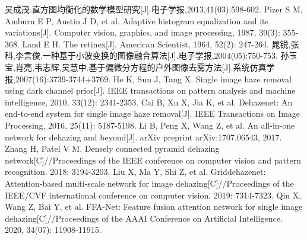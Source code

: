 \documentclass[12pt]{article}
\begin{document}
\begin{thebibliography}{99}  


吴成茂.直方图均衡化的数学模型研究[J].电子学报,2013,41(03):598-602.
Pizer S M, Amburn E P, Austin J D, et al. Adaptive histogram equalization and its variations[J]. Computer vision, graphics, and image processing, 1987, 39(3): 355-368.
Land E H. The retinex[J]. American Scientist, 1964, 52(2): 247-264.
晁锐,张科,李言俊.一种基于小波变换的图像融合算法[J].电子学报,2004(05):750-753.
孙玉宝,肖亮,韦志辉,吴慧中.基于偏微分方程的户外图像去雾方法[J].系统仿真学报,2007(16):3739-3744+3769.
He K, Sun J, Tang X. Single image haze removal using dark channel prior[J]. IEEE transactions on pattern analysis and machine intelligence, 2010, 33(12): 2341-2353.
Cai B, Xu X, Jia K, et al. Dehazenet: An end-to-end system for single image haze removal[J]. IEEE Transactions on Image Processing, 2016, 25(11): 5187-5198.
Li B, Peng X, Wang Z, et al. An all-in-one network for dehazing and beyond[J]. arXiv preprint arXiv:1707.06543, 2017.
Zhang H, Patel V M. Densely connected pyramid dehazing network[C]//Proceedings of the IEEE conference on computer vision and pattern recognition. 2018: 3194-3203.
Liu X, Ma Y, Shi Z, et al. Griddehazenet: Attention-based multi-scale network for image dehazing[C]//Proceedings of the IEEE/CVF international conference on computer vision. 2019: 7314-7323.
Qin X, Wang Z, Bai Y, et al. FFA-Net: Feature fusion attention network for single image dehazing[C]//Proceedings of the AAAI Conference on Artificial Intelligence. 2020, 34(07): 11908-11915.

\end{thebibliography}
\end{document}

